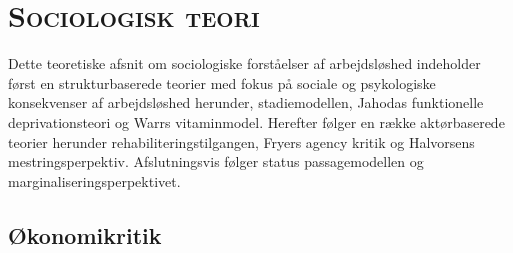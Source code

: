 

\newpage \section{\textsc{Sociologisk teori} \label{}}

Dette teoretiske afsnit om sociologiske forståelser af arbejdsløshed indeholder først en strukturbaserede teorier med fokus på sociale og psykologiske konsekvenser af arbejdsløshed herunder, stadiemodellen, Jahodas funktionelle deprivationsteori og Warrs vitaminmodel. Herefter følger en række aktørbaserede teorier herunder rehabiliteringstilgangen, Fryers agency kritik og Halvorsens mestringsperpektiv. Afslutningsvis følger status passagemodellen og marginaliseringsperpektivet.


\subsection{Økonomikritik}

